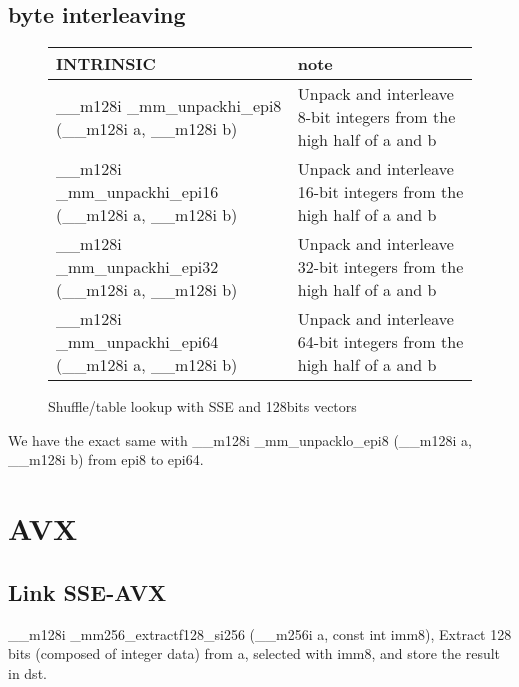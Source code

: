 \documentclass{article}
\begin{document}
\newpage
\subsection{byte interleaving}
\vspace{1cm}
\begin{figure}[h!]
\noindent
\noindent\begin{tabularx}{\linewidth}{|l|X|}
  \hline
  INTRINSIC & note \\
  \hline
\_\_m128i \_mm\_unpackhi\_epi8 (\_\_m128i a, \_\_m128i b) & Unpack and interleave 8-bit integers from the high half of a and b \\
\hline 
\_\_m128i \_mm\_unpackhi\_epi16 (\_\_m128i a, \_\_m128i b) & Unpack and interleave 16-bit integers from the high half of a and b \\
\hline 
\_\_m128i \_mm\_unpackhi\_epi32 (\_\_m128i a, \_\_m128i b) & Unpack and interleave 32-bit integers from the high half of a and b \\
\hline 
\_\_m128i \_mm\_unpackhi\_epi64 (\_\_m128i a, \_\_m128i b) & Unpack and interleave 64-bit integers from the high half of a and b \\
\hline 
\end{tabularx}
    \caption{Shuffle/table lookup with SSE and 128bits vectors}
    \label{fig:set of byte interleaving 128 instructions}
\end{figure}

We have the exact same with \_\_m128i \_mm\_unpacklo\_epi8 (\_\_m128i a, \_\_m128i b) from epi8 to epi64.

\newpage
\section{AVX}
\subsection{Link SSE-AVX}
\_\_m128i \_mm256\_extractf128\_si256 (\_\_m256i a, const int imm8), Extract 128 bits (composed of integer data) from a, selected with imm8, and store the result in dst.
\end{document}
